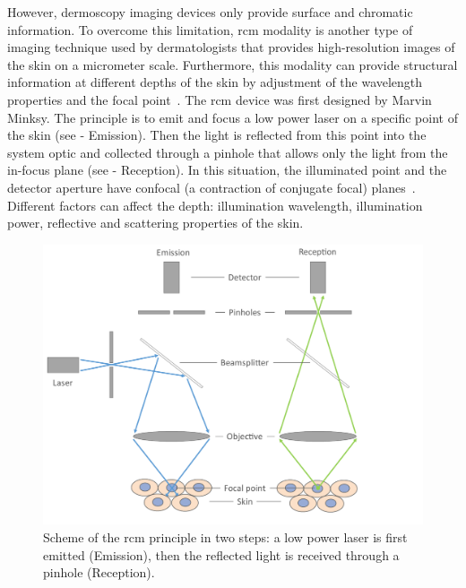 \documentclass[journal,article,accept,moreauthors,pdftex, applsci]{Definitions/mdpi}
\begin{document}
However, dermoscopy imaging devices only provide surface and chromatic information. To overcome this limitation, \ac{rcm} modality is another type of imaging technique used by dermatologists that provides high-resolution images of the skin on a micrometer scale. Furthermore, this modality can provide structural information at different depths of the skin by adjustment of the wavelength properties and the focal point~\cite{Kolm2012}. The \ac{rcm} device was first designed by Marvin Minksy. The principle is to emit and focus a low power laser on a specific point of the skin (see  - Emission). Then the light is reflected from this point into the system optic and collected through a pinhole that allows only the light from the in-focus plane (see  - Reception). In this situation, the illuminated point and the detector aperture have confocal (a contraction of conjugate focal) planes~\cite{Nehal2008a}. Different factors can affect the depth: illumination wavelength, illumination power, reflective and scattering properties of the skin.\par

\begin{figure}[H]
    \begin{center}
        \includegraphics[width=0.6\linewidth]{Figures/RCM.pdf}
        \caption{Scheme of the \ac{rcm} principle in two steps: a low power laser is first emitted (Emission), then the reflected light is received through a pinhole (Reception).}
        \label{fig:rcm}
    \end{center} 
\end{figure}\par
\end{document}
